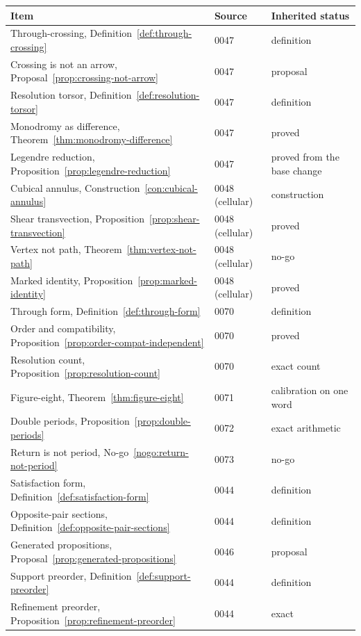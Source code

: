 \begin{longtable}{@{}p{}p{}p{}@{}}
\toprule
Item & Source & Inherited status \\
\midrule
\endhead
Through-crossing, Definition~\ref{def:through-crossing} & 0047 & definition \\
Crossing is not an arrow, Proposal~\ref{prop:crossing-not-arrow} & 0047 & proposal \\
Resolution torsor, Definition~\ref{def:resolution-torsor} & 0047 & definition \\
Monodromy as difference, Theorem~\ref{thm:monodromy-difference} & 0047 & proved \\
Legendre reduction, Proposition~\ref{prop:legendre-reduction} & 0047 & proved from the base
  change \\
Cubical annulus, Construction~\ref{con:cubical-annulus} & 0048 (cellular) & construction \\
Shear transvection, Proposition~\ref{prop:shear-transvection} & 0048 (cellular) & proved \\
Vertex not path, Theorem~\ref{thm:vertex-not-path} & 0048 (cellular) & no-go \\
Marked identity, Proposition~\ref{prop:marked-identity} & 0048 (cellular) & proved \\
Through form, Definition~\ref{def:through-form} & 0070 & definition \\
Order and compatibility, Proposition~\ref{prop:order-compat-independent} & 0070 & proved \\
Resolution count, Proposition~\ref{prop:resolution-count} & 0070 & exact count \\
Figure-eight, Theorem~\ref{thm:figure-eight} & 0071 & calibration on one word \\
Double periods, Proposition~\ref{prop:double-periods} & 0072 & exact arithmetic \\
Return is not period, No-go~\ref{nogo:return-not-period} & 0073 & no-go \\
Satisfaction form, Definition~\ref{def:satisfaction-form} & 0044 & definition \\
Opposite-pair sections, Definition~\ref{def:opposite-pair-sections} & 0044 & definition \\
Generated propositions, Proposal~\ref{prop:generated-propositions} & 0046 & proposal \\
Support preorder, Definition~\ref{def:support-preorder} & 0044 & definition \\
Refinement preorder, Proposition~\ref{prop:refinement-preorder} & 0044 & exact \\

\end{longtable}

